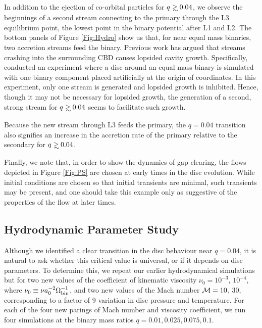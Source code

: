 In addition to the ejection of co-orbital particles for $q\gsim 0.04$,
we observe the beginnings of a second stream connecting to the primary
through the L3 equilibrium point, the lowest point in the
binary potential after L1 and L2. The bottom panels of Figure
\ref{Fig:Hydro} show us that, for near equal mass binaries, two accretion streams feed the binary. 
Previous work \citep{ShiKrolik:2012:ApJ, DHM:2013:MNRAS} has argued 
that streams crashing into the surrounding CBD causes lopsided cavity growth. Specifically, \citep{DHM:2013:MNRAS} conducted an experiment where a disc around an equal mass binary is simulated with one binary component placed artificially at the origin of coordinates. In this experiment, only one stream is generated and lopsided growth is inhibited. Hence, though it may not be necessary for lopsided growth, the generation of a second, strong stream for $q \gsim 0.04$ seems to facilitate such growth.

Because the new stream through L3 feeds the primary,
the $q=0.04$ transition also signifies an increase in the accretion
rate of the primary relative to the secondary for $q\gsim0.04$.

Finally, we note that, in order to show the dynamics of gap clearing, 
the flows depicted in Figure \ref{Fig:PS} are chosen at early times in the disc 
evolution. While initial conditions are chosen so that initial transients 
are minimal, such transients may be present, and one should take 
this example only as suggestive of the properties of the flow at later times.

\subsection{Hydrodynamic Parameter Study}
\label{ParamStudy}
Although we identified a clear transition in the disc behaviour near
$q=0.04$, it is natural to ask whether this critical value is universal,
or if it depends on disc parameters. To determine this, we repeat our earlier
hydrodynamical simulations but for two new values of the coefficient
of kinematic viscosity $\nu_0 = 10^{-3} $, $10^{-4}$, where $\nu_0
\equiv \nu a^{-2}_0 \Omega^{-1}_{\rm{bin}}$, and two new values of the
Mach number $\mathcal{M} = 10$, $30$, corresponding to a factor of 9
variation in disc pressure and temperature. For each of the four new parings of Mach
number and viscosity coefficient, we run four simulations at the
binary mass ratios $q=0.01, 0.025, 0.075, 0.1$.

